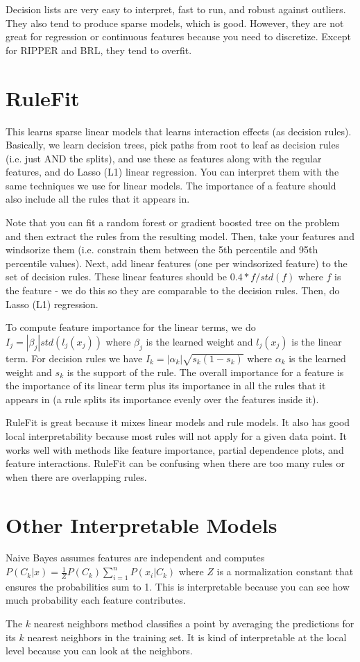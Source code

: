 \documentclass[a4paper]{article}
\begin{document}
Decision lists are very easy to interpret, fast to run, and robust against
outliers. They also tend to produce sparse models, which is good. However, they
are not great for regression or continuous features because you need to
discretize. Except for RIPPER and BRL, they tend to overfit.

\section{RuleFit}
This learns sparse linear models that learns interaction effects (as decision
rules). Basically, we learn decision trees, pick paths from root to leaf as
decision rules (i.e. just AND the splits), and use these as features along with
the regular features, and do Lasso (L1) linear regression. You can interpret them
with the same techniques we use for linear models. The importance of a feature
should also include all the rules that it appears in.

Note that you can fit a
random forest or gradient boosted tree on the problem and then extract the
rules from the resulting model. Then, take your features and windsorize them
(i.e. constrain them between the 5th percentile and 95th percentile values).
Next, add linear features (one per windsorized feature) to the set of
decision rules. These linear features should be $0.4 * f / std(f)$ where $f$
is the feature - we do this so they are comparable to the decision rules. Then,
do Lasso (L1) regression.

To compute feature importance for the linear terms, we do $I_j = |\beta_j| std(
l_j(x_j))$ where $\beta_j$ is the learned weight and $l_j(x_j)$ is the linear
term. For decision rules we have
$I_k = |\alpha_k| \sqrt{s_k (1 - s_k)}$ where $\alpha_k$ is the learned weight
and $s_k$ is the support of the rule. The overall importance for a feature is
the importance of its linear term plus its importance in all the rules that it
appears in (a rule splits its importance evenly over the features inside it).

RuleFit is great because it mixes linear models and rule models. It also has
good local interpretability because most rules will not apply for a given data
point. It works well with methods like feature importance, partial dependence
plots, and feature interactions. RuleFit can be confusing when there are too
many rules or when there are overlapping rules.

\section{Other Interpretable Models}
Naive Bayes assumes features are independent and computes $P(C_k | x) = \frac{1
}{Z} P(C_k) \sum_{i=1}^{n}{P(x_i | C_k)}$ where $Z$ is a normalization constant
that ensures the probabilities sum to 1. This is interpretable because you can
see how much probability each feature contributes.

The $k$ nearest neighbors method classifies a point by averaging the predictions
for its $k$ nearest neighbors in the training set. It is kind of interpretable
at the local level because you can look at the neighbors.
\end{document}
